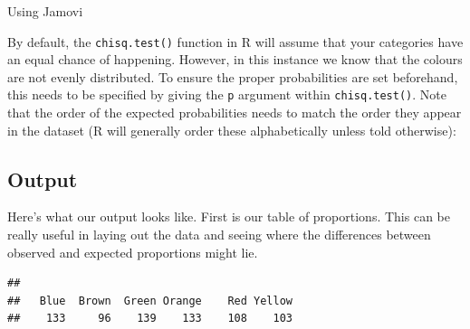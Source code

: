 \documentclass[
]{book}
\newenvironment{Shaded}{\begin{snugshade}}{\end{snugshade}}
\newcommand{\AttributeTok}[1]{\textcolor[rgb]{0.13,0.29,0.53}{#1}}
\newcommand{\CommentTok}[1]{\textcolor[rgb]{0.56,0.35,0.01}{\textit{#1}}}
\newcommand{\FloatTok}[1]{\textcolor[rgb]{0.00,0.00,0.81}{#1}}
\newcommand{\FunctionTok}[1]{\textcolor[rgb]{0.13,0.29,0.53}{\textbf{#1}}}
\newcommand{\NormalTok}[1]{#1}
\newcommand{\OtherTok}[1]{\textcolor[rgb]{0.56,0.35,0.01}{#1}}
\newcommand{\SpecialCharTok}[1]{\textcolor[rgb]{0.81,0.36,0.00}{\textbf{#1}}}
\begin{document}
Using Jamovi

By default, the \texttt{chisq.test()} function in R will assume that your categories have an equal chance of happening. However, in this instance we know that the colours are not evenly distributed. To ensure the proper probabilities are set beforehand, this needs to be specified by giving the \texttt{p} argument within \texttt{chisq.test()}. Note that the order of the expected probabilities needs to match the order they appear in the dataset (R will generally order these alphabetically unless told otherwise):

\begin{Shaded}
\end{Shaded}

\subsection{Output}\label{output}

Here's what our output looks like. First is our table of proportions. This can be really useful in laying out the data and seeing where the differences between observed and expected proportions might lie.

\begin{Shaded}
\end{Shaded}

\begin{verbatim}
## 
##   Blue  Brown  Green Orange    Red Yellow 
##    133     96    139    133    108    103
\end{verbatim}

\begin{Shaded}
\end{Shaded}
\end{document}
